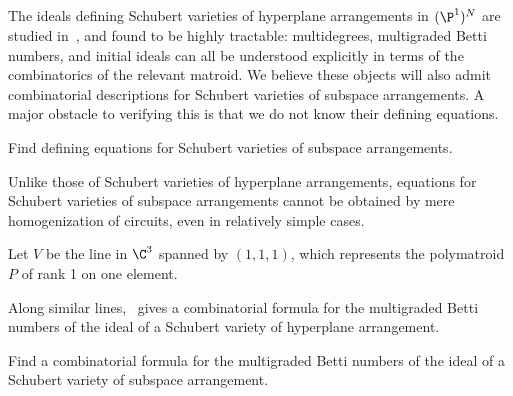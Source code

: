 \subsection{} The ideals defining Schubert varieties of hyperplane arrangements in $(\P^1)^N$ are studied in~\cite{AB16}, and found to be highly tractable: multidegrees, multigraded Betti numbers, and initial ideals can all be understood explicitly in terms of the combinatorics of the relevant matroid.
We believe these objects will also admit combinatorial descriptions for Schubert varieties of subspace arrangements.
A major obstacle to verifying this is that we do not know their defining equations.
\begin{ques}
  Find defining equations for Schubert varieties of subspace arrangements.
\end{ques}
Unlike those of Schubert varieties of hyperplane arrangements, equations for Schubert varieties of subspace arrangements cannot be obtained by mere homogenization of circuits, even in relatively simple cases.
\begin{exam}\label{zb:equations}
  Let $V$ be the line in $\C^3$ spanned by $(1,1,1)$, which represents the polymatroid $P$ of rank 1 on one element.
\end{exam}
Along similar lines,~\cite[Theorem 1.5]{AB16} gives a combinatorial formula for the multigraded Betti numbers of the ideal of a Schubert variety of hyperplane arrangement.
\begin{ques}
  Find a combinatorial formula for the multigraded Betti numbers of the ideal of a Schubert variety of subspace arrangement.
\end{ques}
